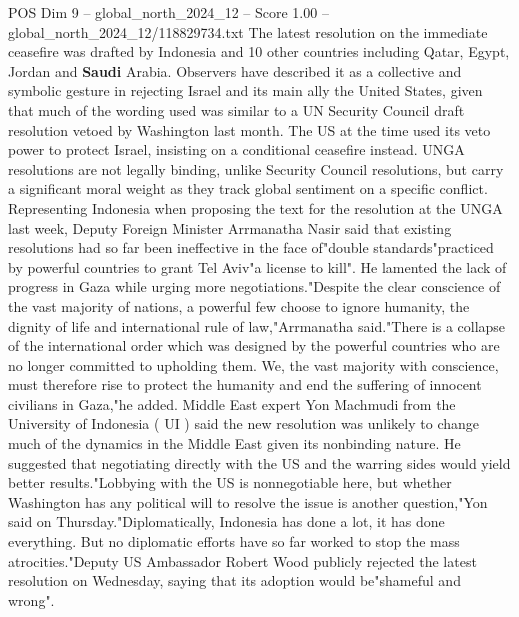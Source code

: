 \begin{textsample}{POS Dim 9 – global\_north\_2024\_12 – Score 1.00 – global\_north\_2024\_12/118829734.txt}
The latest resolution on the immediate ceasefire was drafted by Indonesia and 10 other countries including Qatar, Egypt, Jordan and \textbf{Saudi} Arabia.
Observers have described it as a collective and symbolic gesture in rejecting Israel and its main ally the United States, given that much of the wording used was similar to a UN Security Council draft resolution vetoed by Washington last month.
The US at the time used its veto power to protect Israel, insisting on a conditional ceasefire instead.
UNGA resolutions are not legally binding, unlike Security Council resolutions, but carry a significant moral weight as they track global sentiment on a specific conflict.
Representing Indonesia when proposing the text for the resolution at the UNGA last week, Deputy Foreign Minister Arrmanatha Nasir said that existing resolutions had so far been ineffective in the face of"double standards"practiced by powerful countries to grant Tel Aviv"a license to kill".
He lamented the lack of progress in Gaza while urging more negotiations."Despite the clear conscience of the vast majority of nations, a powerful few choose to ignore humanity, the dignity of life and international rule of law,"Arrmanatha said."There is a collapse of the international order which was designed by the powerful countries who are no longer committed to upholding them.
We, the vast majority with conscience, must therefore rise to protect the humanity and end the suffering of innocent civilians in Gaza,"he added.
Middle East expert Yon Machmudi from the University of Indonesia ( UI ) said the new resolution was unlikely to change much of the dynamics in the Middle East given its nonbinding nature.
He suggested that negotiating directly with the US and the warring sides would yield better results."Lobbying with the US is nonnegotiable here, but whether Washington has any political will to resolve the issue is another question,"Yon said on Thursday."Diplomatically, Indonesia has done a lot, it has done everything.
But no diplomatic efforts have so far worked to stop the mass atrocities."Deputy US Ambassador Robert Wood publicly rejected the latest resolution on Wednesday, saying that its adoption would be"shameful and wrong".

\end{textsample}
